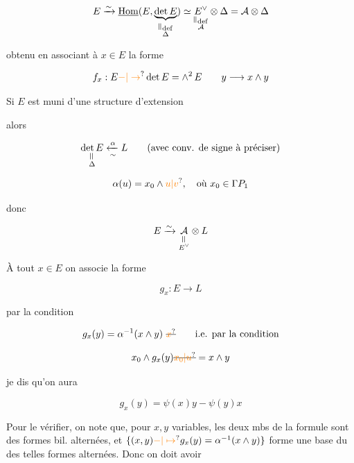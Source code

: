 \[ E\xrightarrow{\sim}\underline{\operatorname{Hom}}(E,\underbrace{\det E}_{\substack{\rotatebox{90}{$=$}\mathrm{def}\\\Delta}})\simeq\underset{\substack{\rotatebox{90}{$=$}\mathrm{def}\\\mathcal A}}{E^\vee}\otimes\Delta=\mathcal A\otimes\Delta \]

obtenu en associant à $x\in E$ la forme

\[ f_x:E\unsure{-|\to}\det E=\mathop{\wedge}\nolimits^2 E\qquad y\longrightarrow x\wedge y \]

Si $E$ est muni d'une structure d'extension


alors

\[ \underset{\substack{\rotatebox{90}{$=$}\\\Delta}}{\det E}\xleftarrow[\sim]{\alpha}L\qquad\text{(avec conv. de signe à préciser)} \]

\[ \alpha(u)=x_0\wedge\unsure{u|v},\quad\text{où }x_0\in\Gamma P_1 \]


donc

\[ E\xrightarrow{\sim}\underset{\substack{\rotatebox{90}{$=$}\\E^\vee}}{\mathcal A}\otimes L \]

À tout $x\in E$ on associe la forme

\[ g_x:E\longrightarrow L \]

 par la condition

\[ g_x(y)=\alpha^{-1}(x\wedge y)\ \deleted{\unsure{x}} \qquad\text{i.e. par la condition} \]

\[ x_0\wedge g_x(y)\deleted{\unsure{x_0|u}}=x\wedge y \]

 je dis qu'on aura 

\[ g_x(y)=\psi(x)y-\psi(y)x \]


Pour le vérifier, on note que, pour $x,y$ variables, les deux mbs de la formule sont des formes bil. alternées, et $\{(x,y)\unsure{-|\mapsto}g_x(y)=\alpha^{-1}(x\wedge y)\}$ forme une base du   des telles formes alternées. Donc on doit avoir

